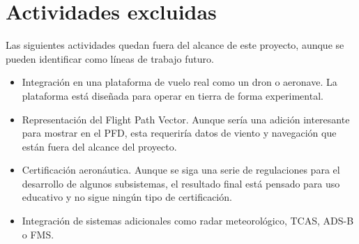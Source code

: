 \vspace{1em}

\section{Actividades excluidas}

Las siguientes actividades quedan fuera del alcance de este proyecto, aunque se pueden identificar como líneas de trabajo futuro.

\begin{itemize}
    \item Integración en una plataforma de vuelo real como un dron o aeronave. La plataforma está diseñada para operar en tierra de forma experimental.
    
    \item Representación del Flight Path Vector. Aunque sería una adición interesante para mostrar en el PFD, esta requeriría datos de viento y navegación que están fuera del alcance del proyecto.
    
    \item Certificación aeronáutica. Aunque se siga una serie de regulaciones para el desarrollo de algunos subsistemas, el resultado final está pensado para uso educativo y no sigue ningún tipo de certificación. 
    
    \item Integración de sistemas adicionales como radar meteorológico, TCAS, ADS-B o FMS.


\end{itemize}